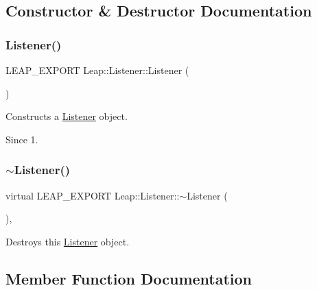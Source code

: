 \subsection{Constructor \& Destructor Documentation}
\mbox{\label{class_leap_1_1_listener_a68f2cc4c80510c7f0bb47d1f576ffea9}} 
\subsubsection{\texorpdfstring{Listener()}{Listener()}}
{\footnotesize\ttfamily L\+E\+A\+P\+\_\+\+E\+X\+P\+O\+RT Leap\+::\+Listener\+::\+Listener (\begin{DoxyParamCaption}{ }\end{DoxyParamCaption})\hspace{0.3cm}{\ttfamily [inline]}}

Constructs a \hyperlink{class_leap_1_1_listener}{Listener} object. \begin{DoxySince}{Since}
1. 
\end{DoxySince}
\mbox{\label{class_leap_1_1_listener_a11a24ce72b609c45ec7010a3cb460d49}} 
\subsubsection{\texorpdfstring{$\sim$\+Listener()}{~Listener()}}
{\footnotesize\ttfamily virtual L\+E\+A\+P\+\_\+\+E\+X\+P\+O\+RT Leap\+::\+Listener\+::$\sim$\+Listener (\begin{DoxyParamCaption}{ }\end{DoxyParamCaption})\hspace{0.3cm}{\ttfamily [inline]}, {\ttfamily [virtual]}}

Destroys this \hyperlink{class_leap_1_1_listener}{Listener} object. 

\subsection{Member Function Documentation}
\mbox{\label{class_leap_1_1_listener_adfef79f9a03b342384aaa17f3a8ebf15}} 
